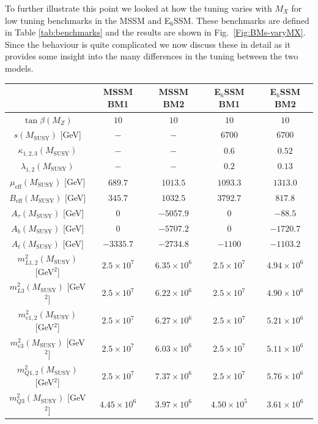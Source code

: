 \documentclass[preprint,amsmath,amssymb,aps,superscriptaddress,prd,showpacs,floatfix,nofootinbib]{revtex4-1}
\begin{document}
To further illustrate this point we looked at how the tuning varies
with $M_X$ for low tuning benchmarks in the MSSM and E$_6$SSM. These
benchmarks are defined in Table \ref{tab:benchmarks} and the results are shown in
Fig.~\ref{Fig:BMs-varyMX}. Since the behaviour is quite complicated we
now discuss these in detail as it provides some insight into the many
differences in the tuning between the two models.

\begingroup
\squeezetable
\begin{table}[h]
\centering
\begin{ruledtabular}
\begin{tabular}{ccccc}
& MSSM BM1 & MSSM BM2 & E$_6$SSM BM1 & E$_6$SSM BM2 \\
\hline
$\tan\beta(M_Z)$ & $10$ & $10$ & $10$ & $10$ \\
$s(M_{\mathrm{SUSY}})$ [GeV] & $-$ & $-$ & $6700$ & $6700$ \\
$\kappa_{1,2,3}(M_{\mathrm{SUSY}})$ & $-$ & $-$ & $0.6$ & $0.52$ \\
$\lambda_{1,2}(M_{\mathrm{SUSY}})$ & $-$ & $-$ & $0.2$ & $0.13$ \\
$\mu_{\mathrm{eff}}(M_{\mathrm{SUSY}})$ [GeV] & $689.7$ & $1013.5$ & $1093.3$ & $1313.0$ \\
$B_{\mathrm{eff}}(M_{\mathrm{SUSY}})$ [GeV] & $345.7$ & $1032.5$ & $3792.7$ & $817.8$ \\
$A_\tau(M_{\mathrm{SUSY}})$ [GeV] & $0$ & $-5057.9$ & $0$ & $-88.5$ \\
$A_b(M_{\mathrm{SUSY}})$ [GeV] & $0$ & $-5707.2$ & $0$ & $-1720.7$\\
$A_t(M_{\mathrm{SUSY}})$ [GeV] & $-3335.7$ & $-2734.8$ & $-1100$ & $-1103.2$ \\
$m_{L1,2}^2(M_{\mathrm{SUSY}})$ [GeV$^2$] & $2.5\times 10^7$ & $6.35\times 10^6$ & $2.5\times 10^7$ & $4.94\times 10^6$ \\
$m_{L3}^2(M_{\mathrm{SUSY}})$ [GeV$^2$] & $2.5\times 10^7$ & $6.22\times 10^6$ & $2.5\times 10^7$ & $4.90\times 10^6$ \\
$m_{e1,2}^2(M_{\mathrm{SUSY}})$ [GeV$^2$] & $2.5\times 10^7$ & $6.27\times 10^6$ & $2.5\times 10^7$ & $5.21\times 10^6$ \\
$m_{e3}^2(M_{\mathrm{SUSY}})$ [GeV$^2$] & $2.5\times 10^7$ & $6.03\times 10^6$ & $2.5\times 10^7$ & $5.11\times 10^6$ \\
$m_{Q1,2}^2(M_{\mathrm{SUSY}})$ [GeV$^2$] & $2.5\times 10^7$ & $7.37\times 10^6$ & $2.5\times 10^7$ & $5.76\times 10^6$ \\
$m_{Q3}^2(M_{\mathrm{SUSY}})$ [GeV$^2$] & $4.45\times 10^6$ & $3.97\times 10^6$ & $4.50\times 10^5$ & $3.61\times 10^6$ \\

\end{tabular}
\end{ruledtabular}
\end{table}
\end{document}
